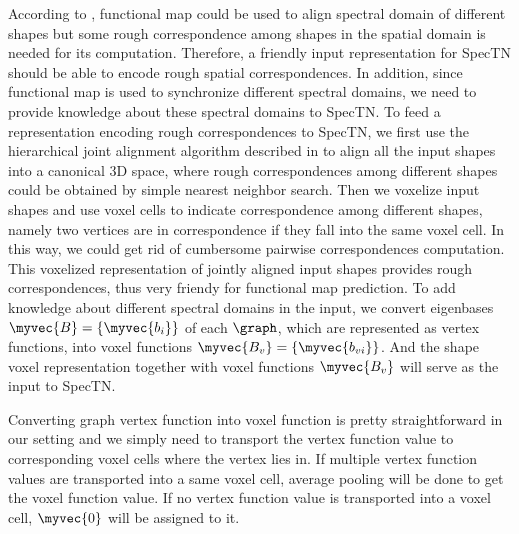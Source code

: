 According to \cite{ovsjanikov2012functional}, functional map could be used to align spectral domain of different shapes but some rough correspondence among shapes in the spatial domain is needed for its computation. Therefore, a friendly input representation for SpecTN should be able to encode rough spatial correspondences. In addition, since functional map is used to synchronize different spectral domains, we need to provide knowledge about these spectral domains to SpecTN. To feed a representation encoding rough correspondences to SpecTN, we first use the hierarchical joint alignment algorithm described in \cite{shapenet2015} to align all the input shapes into a canonical 3D space, where rough correspondences among different shapes could be obtained by simple nearest neighbor search. Then we voxelize input shapes and use voxel cells to indicate correspondence among different shapes, namely two vertices are in correspondence if they fall into the same voxel cell. In this way, we could get rid of cumbersome pairwise correspondences computation. This voxelized representation of jointly aligned input shapes provides rough correspondences, thus very friendy for functional map prediction. To add knowledge about different spectral domains in the input, we convert eigenbases $\myvec{B}=\{\myvec{b_i}\}$ of each $\graph$, which are represented as vertex functions, into voxel functions $\myvec{B_v}=\{\myvec{b_{vi}}\}$. And the shape voxel representation together with voxel functions $\myvec{B_v}$ will serve as the input to SpecTN.

Converting graph vertex function into voxel function is pretty straightforward in our setting and we simply need to transport the vertex function value to corresponding voxel cells where the vertex lies in. If multiple vertex function values are transported into a same voxel cell, average pooling will be done to get the voxel function value. If no vertex function value is transported into a voxel cell, $\myvec{0}$ will be assigned to it.


